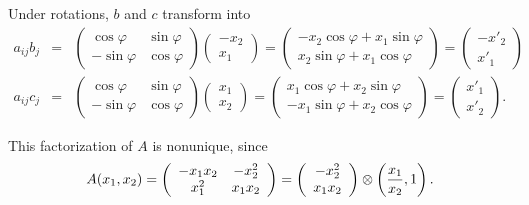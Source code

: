 {Under rotations, $b$ and $c$  transform into
\begin{eqnarray*}
a_{ij}b_j&=&
  \left(
    \begin{array}{cc}
      \cos \varphi  & \sin \varphi \\
      -\sin \varphi & \cos \varphi
    \end{array}
  \right)
  \left(
    \begin{array}{c}
      -x_2\\
       x_1
    \end{array}
  \right)
=
  \left(
    \begin{array}{c}
      -x_2\cos \varphi +x_1 \sin \varphi \\
      x_2\sin \varphi +x_1 \cos \varphi
    \end{array}
  \right)
=
  \left(
    \begin{array}{c}
      -x'_2 \\
      x'_1
    \end{array}
  \right)    \\
 a_{ij}c_j&=&
  \left(
    \begin{array}{cc}
      \cos \varphi  & \sin \varphi \\
      -\sin \varphi & \cos \varphi
    \end{array}
  \right)
  \left(
    \begin{array}{c}
      x_1\\
       x_2
    \end{array}
  \right)
=
  \left(
    \begin{array}{c}
      x_1\cos \varphi +x_2 \sin \varphi \\
      -x_1\sin \varphi +x_2 \cos \varphi
    \end{array}
  \right)
=
  \left(
    \begin{array}{c}
      x'_1    \\
      x'_2
    \end{array}
  \right) .
\end{eqnarray*}

This factorization of $A$ is nonunique, since
$$A(x_1,x_2)=
  \left(
    \begin{array}{cc}
      -x_1x_2 & -x_2^2 \\
      x_1^2   & x_1x_2
    \end{array}
  \right)     =
  \left(
    \begin{array}{cc}
      -x_2^2 \\
      x_1 x_2
    \end{array}
  \right)
\otimes \left({x_1\over x_2},1\right).
$$



\eexample
}



